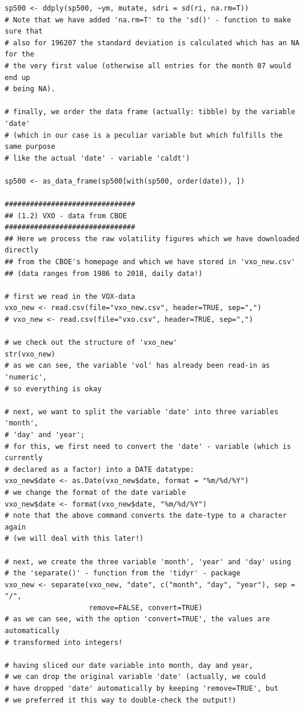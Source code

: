 \documentclass[a4paper,12pt,oneside,pointednumbers,bibtotoc,bigheadings,liststotoc]{scrbook}
\begin{document}
\begin{verbatim}
sp500 <- ddply(sp500, ~ym, mutate, sdri = sd(ri, na.rm=T))
# Note that we have added 'na.rm=T' to the 'sd()' - function to make sure that
# also for 196207 the standard deviation is calculated which has an NA for the
# the very first value (otherwise all entries for the month 07 would end up
# being NA).

# finally, we order the data frame (actually: tibble) by the variable 'date' 
# (which in our case is a peculiar variable but which fulfills the same purpose
# like the actual 'date' - variable 'caldt')

sp500 <- as_data_frame(sp500[with(sp500, order(date)), ])

###############################
## (1.2) VXO - data from CBOE
###############################
## Here we process the raw volatility figures which we have downloaded directly
## from the CBOE's homepage and which we have stored in 'vxo_new.csv'
## (data ranges from 1986 to 2018, daily data!)

# first we read in the VOX-data
vxo_new <- read.csv(file="vxo_new.csv", header=TRUE, sep=",")
# vxo_new <- read.csv(file="vxo.csv", header=TRUE, sep=",")

# we check out the structure of 'vxo_new'
str(vxo_new)
# as we can see, the variable 'vol' has already been read-in as 'numeric',
# so everything is okay

# next, we want to split the variable 'date' into three variables 'month',
# 'day' and 'year';
# for this, we first need to convert the 'date' - variable (which is currently 
# declared as a factor) into a DATE datatype:
vxo_new$date <- as.Date(vxo_new$date, format = "%m/%d/%Y")
# we change the format of the date variable
vxo_new$date <- format(vxo_new$date, "%m/%d/%Y")
# note that the above command converts the date-type to a character again
# (we will deal with this later!)

# next, we create the three variable 'month', 'year' and 'day' using
# the 'separate()' - function from the 'tidyr' - package
vxo_new <- separate(vxo_new, "date", c("month", "day", "year"), sep = "/", 
                    remove=FALSE, convert=TRUE)
# as we can see, with the option 'convert=TRUE', the values are automatically
# transformed into integers!

# having sliced our date variable into month, day and year,
# we can drop the original variable 'date' (actually, we could
# have dropped 'date' automatically by keeping 'remove=TRUE', but
# we preferred it this way to double-check the output!)


\end{verbatim}
\end{document}
